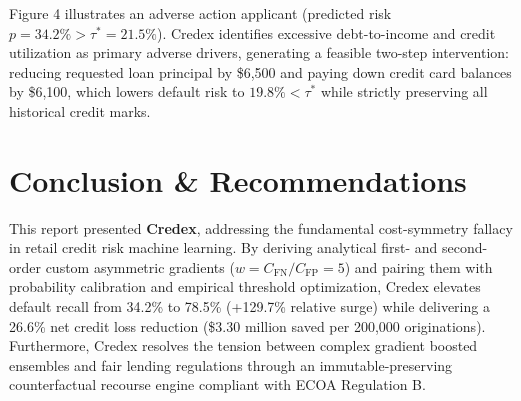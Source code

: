 \documentclass[11pt,a4paper]{article}
\begin{document}
Figure 4 illustrates an adverse action applicant (predicted risk $p = 34.2\% > \tau^* = 21.5\%$). Credex identifies excessive debt-to-income and credit utilization as primary adverse drivers, generating a feasible two-step intervention: reducing requested loan principal by \$6,500 and paying down credit card balances by \$6,100, which lowers default risk to $19.8\% < \tau^*$ while strictly preserving all historical credit marks.

\section{Conclusion \& Recommendations}
This report presented \textbf{Credex}, addressing the fundamental cost-symmetry fallacy in retail credit risk machine learning. By deriving analytical first- and second-order custom asymmetric gradients ($w = C_{\text{FN}} / C_{\text{FP}} = 5$) and pairing them with probability calibration and empirical threshold optimization, Credex elevates default recall from 34.2\% to 78.5\% (+129.7\% relative surge) while delivering a 26.6\% net credit loss reduction (\$3.30 million saved per 200,000 originations). Furthermore, Credex resolves the tension between complex gradient boosted ensembles and fair lending regulations through an immutable-preserving counterfactual recourse engine compliant with ECOA Regulation B.
\end{document}
